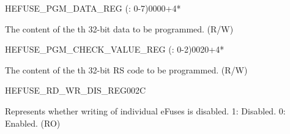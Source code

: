 \begin{register}{H}{EFUSE\_PGM\_DATA\_REG (: 0-7)}{\hexprefix{}0000+4*}\label{regdesc:EFUSEPGMDATANREG}
%
\regnewline%
\begin{regdesc}\begin{reglist}
\label{fielddesc:EFUSEPGMDATAN}\item [EFUSE\_PGM\_DATA\_\regindex{n}] The content of the th 32-bit data to be programmed. (R/W)
\end{reglist}\end{regdesc}
\end{register}


\begin{register}{H}{EFUSE\_PGM\_CHECK\_VALUE\_REG (: 0-2)}{\hexprefix{}0020+4*}\label{regdesc:EFUSEPGMCHECKVALUENREG}
%
\regnewline%
\begin{regdesc}\begin{reglist}
\label{fielddesc:EFUSEPGMRSDATAN}\item [EFUSE\_PGM\_RS\_DATA\_\regindex{n}] The content of the th 32-bit RS code to be programmed. (R/W)
\end{reglist}\end{regdesc}
\end{register}


\begin{register}{H}{EFUSE\_RD\_WR\_DIS\_REG}{\hexprefix{}002C}\label{regdesc:EFUSERDWRDISREG}
%
\regnewline%
\begin{regdesc}\begin{reglist}
\label{fielddesc:EFUSEWRDIS}\item [EFUSE\_WR\_DIS] Represents whether writing of individual eFuses is disabled. 1: Disabled. 0: Enabled. (RO)
\end{reglist}\end{regdesc}
\end{register}


